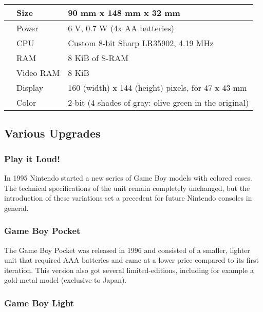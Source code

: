 \documentclass[a4paper,10pt]{book}
\begin{document}
 \begin{longtable}{p{1mm}|l|l|}\hline
 
 &  Size  
 &  90 mm x 148 mm x 32 mm  
 \\\hline
 
 &  Power  
 &  6 V, 0.7 W (4x AA batteries)  
 \\\hline
 
 &  CPU  
 &  Custom 8-bit Sharp LR35902, 4.19 MHz  
 \\\hline
 
 &  RAM  
 &  8 KiB of S-RAM  
 \\\hline
 
 &  Video RAM  
 &  8 KiB  
 \\\hline
 
 &  Display  
 &  160 (width) x 144 (height) pixels, for 47 x 43 mm  
 \\\hline
 
 &  Color  
 &  2-bit (4 shades of gray: olive green in the original)  
 \\\hline
 \end{longtable}
 
 \subsection{Various Upgrades }
 
 \subsubsection{Play it Loud! }
 
          In 1995 Nintendo started a new series of Game Boy models with colored
          cases. The technical specifications of the unit remain completely
          unchanged, but the introduction of these variations set a precedent
          for future Nintendo consoles in general.
         
 
 \subsubsection{Game Boy Pocket }
 
          The Game Boy Pocket was released in 1996 and consisted of a smaller,
          lighter unit that required AAA batteries and came at a lower price
          compared to its first iteration. This version also got several
          limited-editions, including for example a gold-metal model (exclusive
          to Japan).
         
 
 \subsubsection{Game Boy Light }
 
\end{document}
